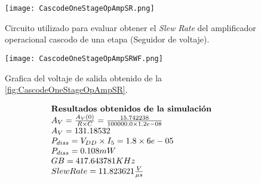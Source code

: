\begin{figure}[ht]
	\centering
	\texttt{[image: CascodeOneStageOpAmpSR.png]}
	\caption{Circuito utilizado para evaluar obtener el \textit{Slew Rate} del amplificador operacional cascodo de una etapa (Seguidor de voltaje). \label{fig:CascodeOneStageOpAmpSR}}
\end{figure}

\begin{figure}[ht]
	\centering
	\texttt{[image: CascodeOneStageOpAmpSRWF.png]}
	\caption{Grafica del voltaje de salida obtenido de la \autoref{fig:CascodeOneStageOpAmpSR}. \label{fig:CascodeOneStageOpAmpSRWF}}
\end{figure}

\begin{equation*}
	\begin{array}{l l}
		\textbf{Resultados obtenidos de la simulación} \\
		A_{V} = \frac{A_{V}(0)}{R \times C} = \frac{ 15.742238 }{ 100000.0 \times 1.2e-08 } \\
		A_{V} =  131.18532  \\
		P_{diss} = V_{DD} \times I_{5} =  1.8 \times 6e-05  \\
		P_{diss} =  0.108  mW \\
		GB =  417.643781  KHz \\
		Slew Rate =  11.823621 \frac{V}{\mu s} \\
	\end{array}
\end{equation*}